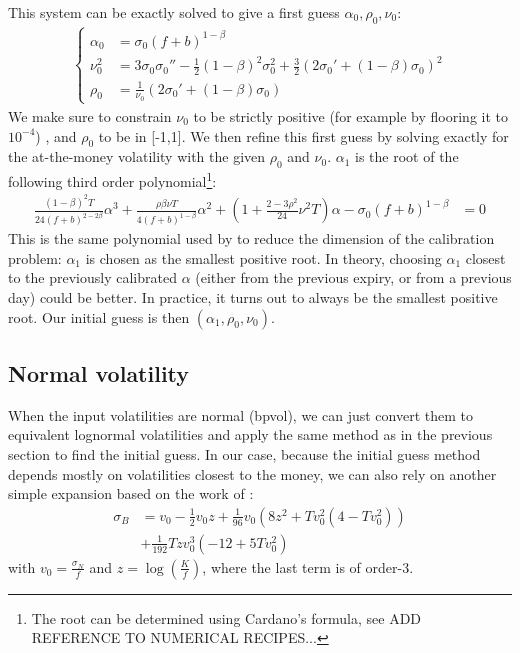 \documentclass[]{rAMF2e}
\begin{document}
This system can be exactly solved to give a first guess $\alpha_0, \rho_0,\nu_0$:
\begin{align}
  \begin{cases}
\alpha_0 &=  \sigma_0 (f+b)^{1-\beta}\\
\nu_0^2 &= 3\sigma_0\sigma_0''-\frac{1}{2}(1-\beta)^2\sigma_0^2+\frac{3}{2}\left(2\sigma_0'+(1-\beta)\sigma_0\right)^2 \\
\rho_0 &= \frac{1}{\nu_0}\left(2\sigma_0'+(1-\beta)\sigma_0\right) 
\end{cases} 
\end{align}
We make sure to constrain $\nu_0$ to be strictly positive (for example by flooring it to $10^{-4}$) , and $\rho_0$ to be in [-1,1]. We then refine this first guess by solving exactly for the at-the-money volatility with the given $\rho_0$ and $\nu_0$. $\alpha_1$ is the root of the following third order polynomial\footnote{The root can be determined using Cardano's formula, see ADD REFERENCE TO NUMERICAL RECIPES...}:
\begin{align}
\frac{(1-\beta)^2 T}{24 (f+b)^{2-2\beta}}\alpha^3+ \frac{\rho\beta\nu T}{4(f+b)^{1-\beta}}\alpha^2 + \left(1+\frac{2-3\rho^2}{24}\nu^2 T\right)\alpha - \sigma_0 (f+b)^{1-\beta} &= 0
\end{align}
This is the same polynomial used by \citet{west2005calibration} to reduce the dimension of the calibration problem: $\alpha_1$ is chosen as the smallest positive root. In theory, choosing $\alpha_1$ closest to the previously calibrated $\alpha$ (either from the previous expiry, or from a previous day) could be better. In practice, it turns out to always be the smallest positive root. 
Our initial guess is then $(\alpha_1, \rho_0, \nu_0)$.
\subsection{Normal volatility}
When the input volatilities are normal (bpvol), we can just convert them to equivalent lognormal volatilities and apply the same method as in the previous section to find the initial guess. In our case, because the initial guess method depends mostly on volatilities closest to the money, we can also rely on another simple expansion based on the work of \citep{lorig2014implied}:
\begin{align}
\sigma_B &= v_0 - \frac{1}{2}v_0 z + \frac{1}{96}v_0(8z^2+T v_0^2 (4-T v_0^2)) \nonumber \\
         &+ \frac{1}{192}T z v_0^3 (-12+5T v_0^2)
\end{align}
with $v_0 = \frac{\sigma_N}{f}$ and $z=\log(\frac{K}{f})$, where the last term is of order-3.
\end{document}
